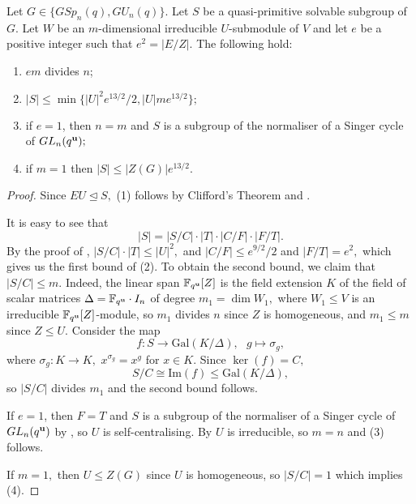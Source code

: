 \begin{Lem}\label{uniqorder}
Let $G \in \{GSp_{n}(q), GU_n(q)\}$. Let $S$ be a quasi-primitive solvable  subgroup of  $G$. Let $W$ be an $m$-dimensional  irreducible $U$-submodule of $V$ and let $e$ be a positive integer such that $e^2=|E/Z|$.  The following hold:
\begin{enumerate}[font=\normalfont]
\item $em$  divides $n$;
\item $|S| \le \min\{|U|^2e^{13/2}/2, |U|me^{13/2} \};$
\item if $e=1$, then $n=m$ and $S$ is a subgroup of the normaliser of a Singer cycle of $GL_n(q^{\bf u});$
\item if $m=1$ then $|S| \le |Z(G)|e^{13/2}.$
\end{enumerate}
\end{Lem}
\begin{proof}
Since $EU \trianglelefteq S,$ (1) follows by Clifford's Theorem and \cite[Corollary 2.6]{manz}.

It is easy to see that 
$$|S|=|S/C|\cdot |T| \cdot|C/F| \cdot|F/T|.$$
By the proof of \cite[Corollary 3.7]{manz}, $|S/C| \cdot |T| \le |U|^2,$ and $|C/F| \le e^{9/2}/2$ and $|F/T|=e^2,$ which gives us the first bound of (2). To obtain the second bound, we claim that $|S/C|\le m.$ Indeed, the linear span ${\mathbb{F}_{q^{\bf u}}}[Z]$ is the field extension $K$ of the field of scalar matrices $\Delta=\mathbb{F}_{q^{\bf u}}\cdot I_n$ of degree $m_1 = \dim W_1,$ where $W_1 \le V$ is an irreducible $\mathbb{F}_{q^{\bf u}}[Z]$-module, so $m_1$ divides $n$ since $Z$ is homogeneous, and $m_1 \le m$ since $Z \le U$. Consider the map 
$$f:S \to \mathrm{Gal}(K/\Delta), \text{ } g \mapsto \sigma_g,$$
where $\sigma_g : K \to K,$ $x^{\sigma_g}=x^g$ for $x \in K.$ Since $\ker(f)=C,$
$$S/C \cong \mathrm{Im}(f) \le {\mathrm{Gal}}(K/\Delta), $$
so $|S/C|$ divides $m_1$ and the second bound follows.


If $e=1$, then $F=T$ and $S$ is a subgroup of the normaliser of a Singer cycle of $GL_n(q^{\bf u})$ by \cite[Corollary 2.3]{manz}, so $U$ is self-centralising. By \cite[Lemma 2.2]{manz} $U$ is irreducible, so $m=n$ %
 and (3) follows.

If $m=1,$ then $U \le Z(G)$ since $U$ is homogeneous, so  $|S/C|=1$ which implies (4). 
\end{proof}




